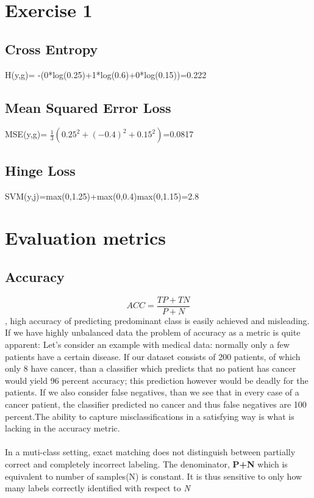 \documentclass[10pt]{article}
\begin{document}
\section{Exercise 1}
\subsection{Cross Entropy}
H(y,g)= -(0*log(0.25)+1*log(0.6)+0*log(0.15))=0.222
\subsection{Mean Squared Error Loss}
MSE(y,g)= $\frac{1}{3}(0.25^2+(-0.4)^2+0.15^2)$=0.0817
\subsection{Hinge Loss}
SVM(y,j)=max(0,1.25)+max(0,0.4)max(0,1.15)=2.8

\section{Evaluation metrics}
\subsection{Accuracy}
$$ACC = \frac{TP+TN}{P+N}$$, high accuracy of predicting predominant class is easily achieved and misleading.
If we have highly unbalanced data the problem of accuracy as a metric is quite apparent:
Let's consider an example with medical data: normally only a few patients have a certain disease.
If our dataset consists of 200 patients, of which only 8 have cancer, than a classifier which predicts
that no patient has cancer would yield 96 percent accuracy;
this prediction however would be deadly for the patients.
If we also consider false negatives, than we see that in every case of a cancer patient,
the classifier predicted no cancer and thus false negatives are 100 percent.The ability to  capture misclassifications in a satisfying way is what is lacking in the accuracy metric.
\paragraph{}
In a muti-class setting, exact matching does not distinguish between partially correct and completely incorrect labeling.
The denominator, \textbf{P+N} which is equivalent to number of samples(N) is constant. It is thus sensitive to only how many labels correctly identified with respect to \textit{N}
\end{document}
